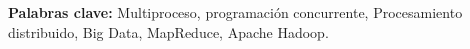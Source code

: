 \textbf{Palabras clave:} Multiproceso, programación concurrente,
  Procesamiento distribuido, Big Data, MapReduce, Apache Hadoop.
